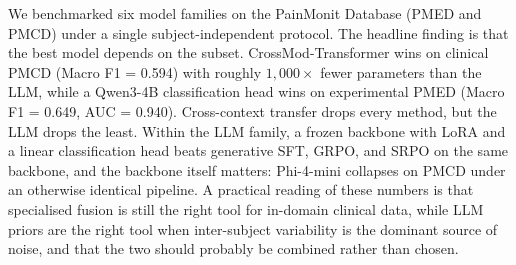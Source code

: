 \documentclass{article}
\begin{document}
We benchmarked six model families on the PainMonit Database (PMED and PMCD) under a single subject-independent protocol. The headline finding is that the best model depends on the subset. CrossMod-Transformer wins on clinical PMCD (Macro F1 = 0.594) with roughly $1{,}000\times$ fewer parameters than the LLM, while a Qwen3-4B classification head wins on experimental PMED (Macro F1 = 0.649, AUC = 0.940). Cross-context transfer drops every method, but the LLM drops the least. Within the LLM family, a frozen backbone with LoRA and a linear classification head beats generative SFT, GRPO, and SRPO on the same backbone, and the backbone itself matters: Phi-4-mini collapses on PMCD under an otherwise identical pipeline. A practical reading of these numbers is that specialised fusion is still the right tool for in-domain clinical data, while LLM priors are the right tool when inter-subject variability is the dominant source of noise, and that the two should probably be combined rather than chosen.



\end{document}
